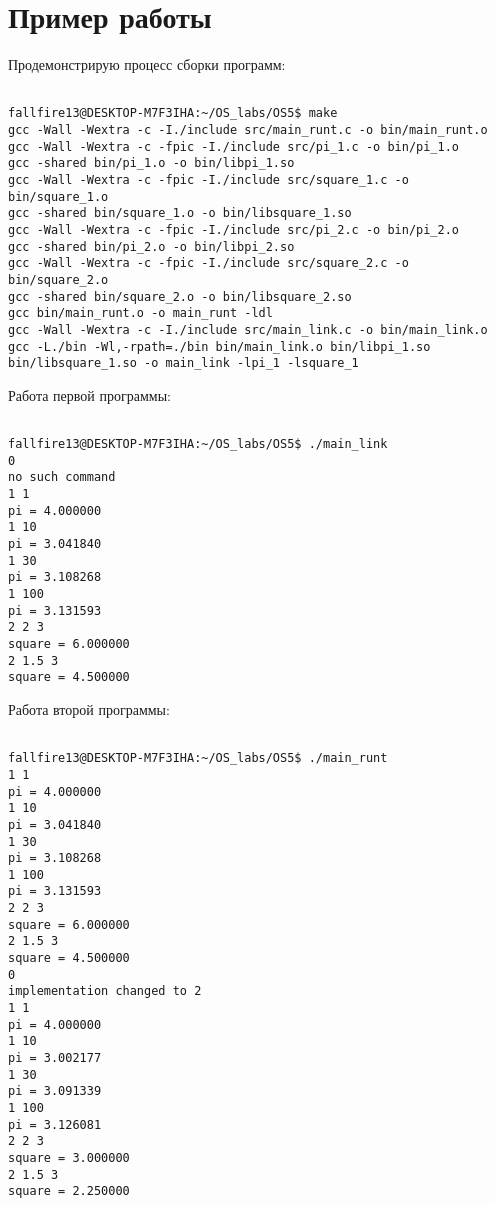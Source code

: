 \section{Пример работы}

Продемонстрирую процесс сборки программ:

\begin{verbatim}

fallfire13@DESKTOP-M7F3IHA:~/OS_labs/OS5$ make
gcc -Wall -Wextra -c -I./include src/main_runt.c -o bin/main_runt.o
gcc -Wall -Wextra -c -fpic -I./include src/pi_1.c -o bin/pi_1.o
gcc -shared bin/pi_1.o -o bin/libpi_1.so
gcc -Wall -Wextra -c -fpic -I./include src/square_1.c -o bin/square_1.o
gcc -shared bin/square_1.o -o bin/libsquare_1.so
gcc -Wall -Wextra -c -fpic -I./include src/pi_2.c -o bin/pi_2.o
gcc -shared bin/pi_2.o -o bin/libpi_2.so
gcc -Wall -Wextra -c -fpic -I./include src/square_2.c -o bin/square_2.o
gcc -shared bin/square_2.o -o bin/libsquare_2.so
gcc bin/main_runt.o -o main_runt -ldl
gcc -Wall -Wextra -c -I./include src/main_link.c -o bin/main_link.o
gcc -L./bin -Wl,-rpath=./bin bin/main_link.o bin/libpi_1.so bin/libsquare_1.so -o main_link -lpi_1 -lsquare_1

\end{verbatim}

Работа первой программы:

\begin{verbatim}

fallfire13@DESKTOP-M7F3IHA:~/OS_labs/OS5$ ./main_link
0
no such command
1 1
pi = 4.000000
1 10
pi = 3.041840
1 30
pi = 3.108268
1 100
pi = 3.131593
2 2 3
square = 6.000000
2 1.5 3
square = 4.500000

\end{verbatim}

\pagebreak

Работа второй программы:

\begin{verbatim}

fallfire13@DESKTOP-M7F3IHA:~/OS_labs/OS5$ ./main_runt
1 1
pi = 4.000000
1 10
pi = 3.041840
1 30
pi = 3.108268
1 100
pi = 3.131593
2 2 3
square = 6.000000
2 1.5 3
square = 4.500000
0
implementation changed to 2
1 1
pi = 4.000000
1 10
pi = 3.002177
1 30
pi = 3.091339
1 100
pi = 3.126081
2 2 3
square = 3.000000
2 1.5 3
square = 2.250000

\end{verbatim}

\pagebreak


